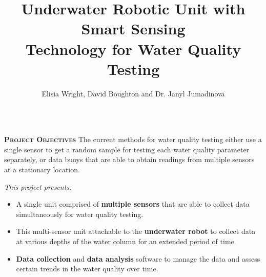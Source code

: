 \documentclass[final,t]{beamer}
\title[]{Underwater Robotic Unit with Smart Sensing  \\ Technology
  for Water Quality Testing }
\author[Wright]{Elisia Wright, David Boughton and Dr. Janyl Jumadinova}
\institute{Department of Computer Science \\ Allegheny College, Meadville, PA}
\begin{document}
    \begin{frame}{}
        \begin{columns}[t]
        	\begin{column}{1\linewidth}

                \begin{alertblock}{\textsc{\textbf{Project Objectives}}}
                    \vspace*{2mm}
                    The current methods for water quality testing either use a
                    single sensor to get a random sample for testing each water
                    quality	parameter separately, or data buoys that are able to
                    obtain readings from multiple sensors at a stationary location.
                    \vspace{2mm}

                    \emph{This project presents:}
                    \begin{itemize}
                        \item A single unit comprised of \textbf{multiple sensors}
                        that are able to collect data simultaneously for water
                        quality testing.
                        \item This multi-sensor unit attachable to the \textbf{underwater robot}
                        to collect data at various depths of the water column for
                        an extended period of time.
                        \item \textbf{Data collection} and \textbf{data analysis}
                        software to manage the data and assess certain trends in
                        the water quality over time.
                    \end{itemize}
                    \vspace*{6mm}
                \end{alertblock}
			\end{column}
		\end{columns}


\end{frame}
\end{document}
